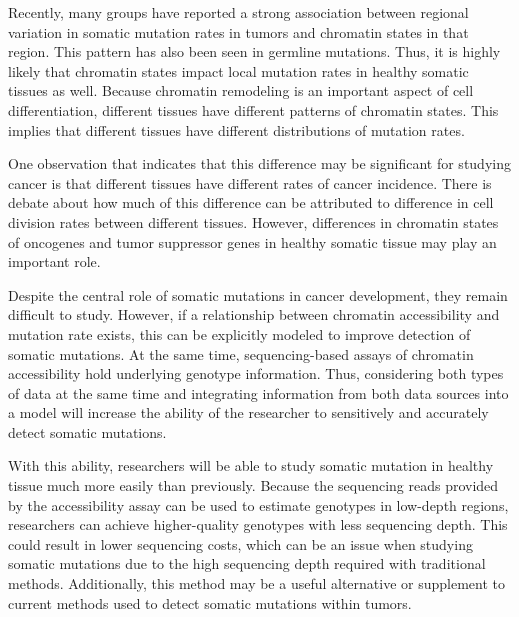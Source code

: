 Recently, many groups have reported a strong association between regional variation in somatic mutation rates in tumors and chromatin states in that region.
This pattern has also been seen in germline mutations.
Thus, it is highly likely that chromatin states impact local mutation rates in healthy somatic tissues as well.
Because chromatin remodeling is an important aspect of cell differentiation, different tissues have different patterns of chromatin states.
This implies that different tissues have different distributions of mutation rates.

One observation that indicates that this difference may be significant for studying cancer is that different tissues have different rates of cancer incidence.
There is debate about how much of this difference can be attributed to difference in cell division rates between different tissues.
However, differences in chromatin states of oncogenes and tumor suppressor genes in healthy somatic tissue may play an important role.


Despite the central role of somatic mutations in cancer development, they remain difficult to study.
However, if a relationship between chromatin accessibility and mutation rate exists, this can be explicitly modeled to improve detection of somatic mutations.
At the same time, sequencing-based assays of chromatin accessibility hold underlying genotype information.
Thus, considering both types of data at the same time and integrating information from both data sources into a model will increase the ability of the researcher to sensitively and accurately detect somatic mutations.

With this ability, researchers will be able to study somatic mutation in healthy tissue much more easily than previously.
Because the sequencing reads provided by the accessibility assay can be used to estimate genotypes in low-depth regions, researchers can achieve higher-quality genotypes with less sequencing depth.
This could result in lower sequencing costs, which can be an issue when studying somatic mutations due to the high sequencing depth required with traditional methods.
Additionally, this method may be a useful alternative or supplement to current methods used to detect somatic mutations within tumors.


